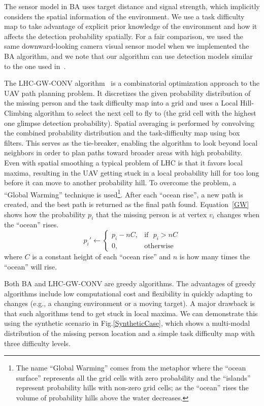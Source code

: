 \documentclass[journal]{IEEEtran}
\begin{document}
The sensor model in BA uses target distance and signal strength, which implicitly considers the spatial information of the environment. We use a task difficulty map to take advantage of explicit prior knowledge of the environment and how it affects the detection probability spatially. For a fair comparison, we used the same downward-looking camera visual sensor model when we implemented the BA algorithm, and we note that our algorithm can use detection models similar to the one used in~\cite{Bourgault2006}.

The LHC-GW-CONV algorithm~\cite{lin2009uav} is a combinatorial optimization approach to the UAV path planning problem. It discretizes the given probability distribution of the missing person and the task difficulty map into a grid and uses a Local Hill-Climbing algorithm to select the next cell to fly to (the grid cell with the highest one glimpse detection probability). Spatial averaging is performed by convolving the combined probability distribution and the task-difficulty map using box filters. This serves as the tie-breaker, enabling the algorithm to look beyond local neighbors in order to plan paths toward broader areas with high probability. Even with spatial smoothing a typical problem of LHC is that it favors local maxima, resulting in the UAV getting stuck in a local probability hill for too long before it can move to another probability hill. To overcome the problem, a ``Global Warming'' technique is used\footnote{The name ``Global Warming'' comes from the metaphor where the ``ocean surface'' represents all the grid cells with zero probability and the ``islands'' represent probability hills with non-zero grid cells; as the ``ocean'' rises the volume of probability hills above the water decreases.}. After each ``ocean rise'', a new path is created, and the best path is returned as the final path found. Equation~\ref{GW} shows how the probability $p_i$ that the missing person is at vertex $v_i$  changes when the ``ocean'' rises.
\begin{equation}
p_i' \leftarrow
	\left\{
	\begin{array}{ll}
		p_i - nC, & \mbox{if~~} p_i > nC \\
		0, & \mbox{otherwise}
	\end{array}
	\right.
\label{GW}
\end{equation}
where $C$ is a constant height of each ``ocean rise'' and $n$ is how many times the ``ocean'' will rise.

Both BA and LHC-GW-CONV are greedy algorithms. The advantages of greedy algorithms include low computational cost and flexibility in quickly adapting to changes (e.g., a changing environment or a moving target). A major drawback is that such algorithms tend to get stuck in local maxima. We can demonstrate this using the synthetic scenario in Fig.\ref{SyntheticCase}, which shows a multi-modal distribution of the missing person location and a simple task difficulty map with three difficulty levels. 
\end{document}
